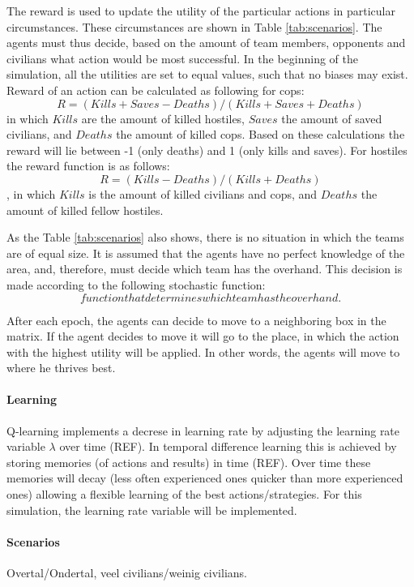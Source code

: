 The reward is used to update the utility of the particular actions in particular circumstances. These circumstances are shown in Table \ref{tab:scenarios}. The agents must thus decide, based on the amount of team members, opponents and civilians what action would be most successful. In the beginning of the simulation, all the utilities are set to equal values, such that no biases may exist. Reward of an action can be calculated as following for cops: 
$$ R = (Kills + Saves - Deaths)/(Kills + Saves + Deaths)$$
in which $Kills$ are the amount of killed hostiles, $Saves$ the amount of saved civilians, and $Deaths$ the amount of killed cops. Based on these calculations the reward will lie between -1 (only deaths) and 1 (only kills and saves). For hostiles the reward function is as follows:
$$ R = (Kills - Deaths)/(Kills + Deaths)$$
, in which $Kills$ is the amount of killed civilians and cops, and $Deaths$ the amount of killed fellow hostiles. 

As the Table \ref{tab:scenarios} also shows, there is no situation in which the teams are of equal size. It is assumed that the agents have no perfect knowledge of the area, and, therefore, must decide which team has the overhand. This decision is made according to the following stochastic function:
$$ function that determines which team has the overhand. $$

After each epoch, the agents can decide to move to a neighboring box in the matrix. If the agent decides to move it will go to the place, in which the action with the highest utility will be applied. In other words, the agents will move to where he thrives best. 
\paragraph{Learning}



Q-learning implements a decrese in learning rate by adjusting the learning rate variable $\lambda$ over time (REF). In temporal difference learning this is achieved by storing memories (of actions and results) in time (REF). Over time these memories will decay (less often experienced ones quicker than more experienced ones) allowing a flexible learning of the best actions/strategies. For this simulation, the learning rate variable will be implemented. 



\paragraph{Scenarios}
Overtal/Ondertal, veel civilians/weinig civilians. 
